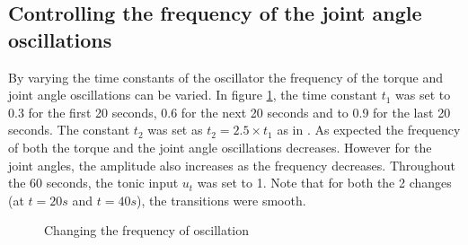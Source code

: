 \documentclass[12pt,twoside]{article}
\theoremstyle{plain}
\theoremstyle{definition}
\theoremstyle{remark}
\begin{document}
\subsection{Controlling the frequency of the joint angle oscillations}
By varying the time constants of the oscillator the frequency of the torque and joint angle oscillations can be varied. In figure \ref{fig:change-freq}, the time constant $t_1$ was set to 0.3 for the first 20 seconds, 0.6 for the next 20 seconds and to 0.9 for the last 20 seconds. The constant $t_2$ was set as $t_2 = 2.5 \times t_1$ as in \cite{ronsse2009computational}. As expected the frequency of both the torque and the joint angle oscillations decreases. However for the joint angles, the amplitude also increases as the frequency decreases. Throughout the 60 seconds, the tonic input $u_t$ was set to 1. Note that for both the 2 changes (at $t=20s$ and $t=40s$), the transitions were smooth.

\begin{figure}[htbp]
\centering     %
{}
\caption{Changing the frequency of oscillation}
\label{fig:change-freq}
\end{figure}
\end{document}
